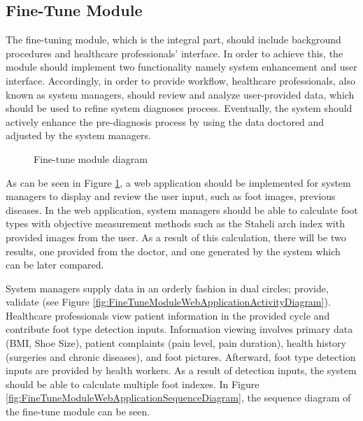 \subsection{ Fine-Tune Module }\label{sec:FineTuneModule}

The fine-tuning module, which is the integral part, should include background procedures and healthcare professionals' interface. In order to achieve this, the module should implement two functionality namely system enhancement and user interface. Accordingly, in order to provide workflow, healthcare professionals, also known as system managers, should review and analyze user-provided data, which should be used to refine system diagnoses process. Eventually, the system should actively enhance the pre-diagnosis process by using the data doctored and adjusted by the system managers.

\begin{figure}[htbp]
\centering
{}
\caption{Fine-tune module diagram}
\label{fig:FineTuneModuleDiagram}
\end{figure}

As can be seen in Figure \ref{fig:FineTuneModuleDiagram}, a web application should be implemented for system managers to display and review the user input, such as foot images, previous diseases. In the web application, system managers should be able to calculate foot types with objective measurement methods such as the Staheli arch index with provided images from the user. As a result of this calculation, there will be two results, one provided from the doctor, and one generated by the system which can be later compared.


System managers supply data in an orderly fashion in dual circles; provide, validate (see Figure \ref{fig:FineTuneModuleWebApplicationActivityDiagram}). Healthcare professionals view patient information in the provided cycle and contribute foot type detection inputs. Information viewing involves primary data (BMI, Shoe Size), patient complaints (pain level, pain duration), health history (surgeries and chronic diseases), and foot pictures. Afterward, foot type detection inputs are provided by health workers. As a result of detection inputs, the system should be able to calculate multiple foot indexes. In Figure \ref{fig:FineTuneModuleWebApplicationSequenceDiagram}, the sequence diagram of the fine-tune module can be seen.

